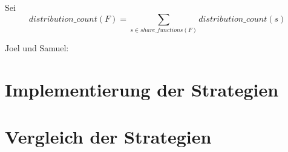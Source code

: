 \documentclass[a4paper,12pt]{llncs}
\numberwithin{equation}{section}
\begin{document}
\begin{definition}
Sei
\[
distribution\_count(F)=\sum_{s \in share\_functions(F)}{distribution\_count(s)}
\]
\end{definition}

Joel und Samuel:

\section{Implementierung der Strategien}

\section{Vergleich der Strategien}


\newpage

 

\end{document}
